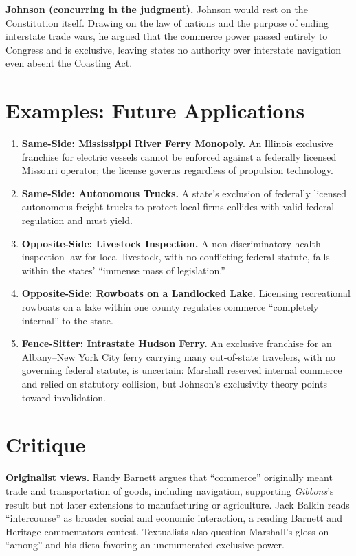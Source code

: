 \documentclass[12pt]{article}
\begin{document}
\textbf{Johnson (concurring in the judgment).} Johnson would rest on the Constitution itself. Drawing on the law of nations and the purpose of ending interstate trade wars, he argued that the commerce power passed entirely to Congress and is exclusive, leaving states no authority over interstate navigation even absent the Coasting Act.

\section{Examples: Future Applications}

\begin{enumerate}
\item \textbf{Same-Side: Mississippi River Ferry Monopoly.} An Illinois exclusive franchise for electric vessels cannot be enforced against a federally licensed Missouri operator; the license governs regardless of propulsion technology.
\item \textbf{Same-Side: Autonomous Trucks.} A state's exclusion of federally licensed autonomous freight trucks to protect local firms collides with valid federal regulation and must yield.
\item \textbf{Opposite-Side: Livestock Inspection.} A non-discriminatory health inspection law for local livestock, with no conflicting federal statute, falls within the states' ``immense mass of legislation.''
\item \textbf{Opposite-Side: Rowboats on a Landlocked Lake.} Licensing recreational rowboats on a lake within one county regulates commerce ``completely internal'' to the state.
\item \textbf{Fence-Sitter: Intrastate Hudson Ferry.} An exclusive franchise for an Albany--New York City ferry carrying many out-of-state travelers, with no governing federal statute, is uncertain: Marshall reserved internal commerce and relied on statutory collision, but Johnson's exclusivity theory points toward invalidation.
\end{enumerate}

\section{Critique}

\textbf{Originalist views.} Randy Barnett argues that ``commerce'' originally meant trade and transportation of goods, including navigation, supporting \textit{Gibbons}'s result but not later extensions to manufacturing or agriculture. Jack Balkin reads ``intercourse'' as broader social and economic interaction, a reading Barnett and Heritage commentators contest. Textualists also question Marshall's gloss on ``among'' and his dicta favoring an unenumerated exclusive power.
\end{document}
